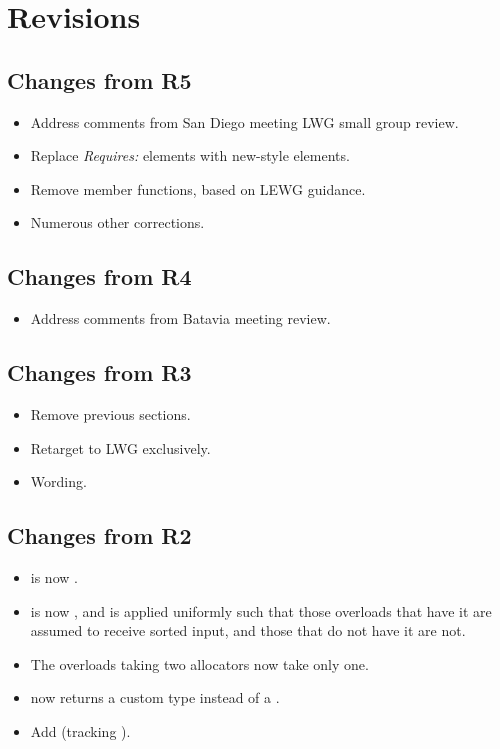 \section{Revisions}

\subsection{Changes from R5}

\begin{itemize}
  \item Address comments from San Diego meeting LWG small group review.
  \item Replace \textit{Requires:} elements with new-style elements.
  \item Remove  member functions, based on LEWG guidance.
  \item Numerous other corrections.
\end{itemize}

\subsection{Changes from R4}

\begin{itemize}
  \item Address comments from Batavia meeting review.
\end{itemize}

\subsection{Changes from R3}

\begin{itemize}
  \item Remove previous sections.
  \item Retarget to LWG exclusively.
  \item Wording.
\end{itemize}

\subsection{Changes from R2}

\begin{itemize}
  \item {} is now .
  \item {} is now , and
    is applied uniformly such that those overloads that have it are assumed to
    receive sorted input, and those that do not have it are not.
  \item The overloads taking two allocators now take only one.
  \item {} now returns a custom type instead of a .
  \item Add  (tracking ).
\end{itemize}

